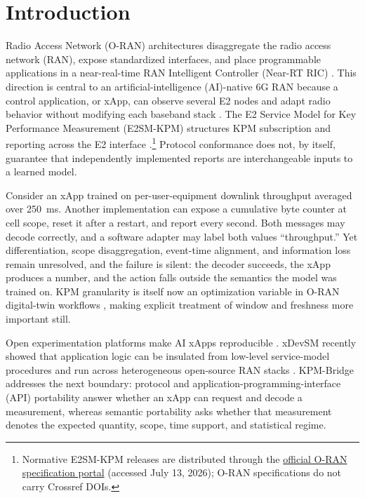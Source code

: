 \documentclass[10pt,journal,twoside]{IEEEtran}
\begin{document}
\section{Introduction}
 Radio Access Network (O-RAN) architectures disaggregate the radio access network (RAN), expose standardized interfaces, and place programmable applications in a near-real-time RAN Intelligent Controller (Near-RT RIC) \cite{polese2023understanding,alam2026survey,garcia2021oran}. This direction is central to an artificial-intelligence (AI)-native 6G RAN because a control application, or xApp, can observe several E2 nodes and adapt radio behavior without modifying each baseband stack \cite{bonati2021intelligence,niknam2022intelligent,wang2026oran6g}. The E2 Service Model for Key Performance Measurement (E2SM-KPM) structures KPM subscription and reporting across the E2 interface \cite{feraudo2024xdevsm}.\footnote{Normative E2SM-KPM releases are distributed through the \href{https://specifications.o-ran.org/}{official O-RAN specification portal} (accessed July 13, 2026); O-RAN specifications do not carry Crossref DOIs.} Protocol conformance does not, by itself, guarantee that independently implemented reports are interchangeable inputs to a learned model.

Consider an xApp trained on per-user-equipment downlink throughput averaged over 250~ms. Another implementation can expose a cumulative byte counter at cell scope, reset it after a restart, and report every second. Both messages may decode correctly, and a software adapter may label both values ``throughput.'' Yet differentiation, scope disaggregation, event-time alignment, and information loss remain unresolved, and the failure is silent: the decoder succeeds, the xApp produces a number, and the action falls outside the semantics the model was trained on. KPM granularity is itself now an optimization variable in O-RAN digital-twin workflows \cite{huseynov2026granularity}, making explicit treatment of window and freshness more important still.

Open experimentation platforms make AI xApps reproducible \cite{polese2023coloran,bonati2022openrangym,bonati2023openrangym,lacava2023nsoran,upadhyaya2023oaic}. xDevSM recently showed that application logic can be insulated from low-level service-model procedures and run across heterogeneous open-source RAN stacks \cite{feraudo2024xdevsm,feraudo2026xdevsm}. KPM-Bridge addresses the next boundary: protocol and application-programming-interface (API) portability answer whether an xApp can request and decode a measurement, whereas semantic portability asks whether that measurement denotes the expected quantity, scope, time support, and statistical regime.
\end{document}
